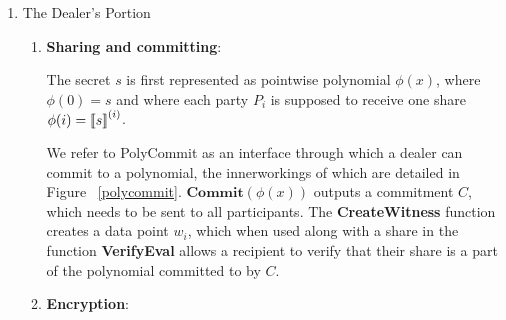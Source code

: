 \documentclass{sig-alternate-05-2015}
\begin{document}
\begin{enumerate}
\item The Dealer's Portion
\begin{enumerate}
\item \textbf{Sharing and committing}:


  The secret $s$ is first represented as pointwise polynomial $\phi(x)$, where $\phi(0) = s$ and where each party $P_i$ is supposed to receive one share $\phi(i) = { \llbracket {s} \rrbracket }^{(i)}$.
  
  We refer to PolyCommit as an interface through which a dealer can commit to a polynomial, the innerworkings of which are detailed in Figure ~\ref{polycommit}. $\textbf{Commit}( \phi(x) )$ outputs a commitment $C$, which needs to be sent to all participants. The \textbf{CreateWitness} function creates a data point $w_i$, which when used along with a share in the function \textbf{VerifyEval} allows a recipient to verify that their share is a part of the polynomial committed to by $C$.
  
\item \textbf{Encryption}:



\end{enumerate}
\end{enumerate}
\end{document}
